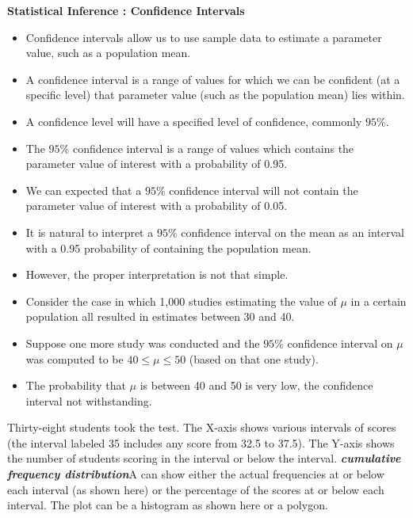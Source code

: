 \documentclass[]{report}
\begin{document}

\textbf{Statistical Inference : Confidence Intervals}
\begin{itemize}
\item Confidence intervals allow us to use sample data to estimate a parameter value, such as a population mean.
\item A confidence interval is a range of values for which we can be confident (at a specific level) that parameter value (such as the population mean)  lies within.
\item A confidence level will have a specified level of confidence, commonly $95\%$.
\item The $95\%$ confidence interval is a range of values which contains the parameter value of interest with a probability of 0.95.
\item We can expected that a $95\%$ confidence interval will not contain the parameter value of interest with a probability of 0.05.
\end{itemize}



\begin{itemize}

\item It is natural to interpret a $95\%$ confidence interval on the mean as an interval with a 0.95 probability of containing the population mean.
\item However, the proper interpretation is not that simple.
\item Consider the case in which 1,000 studies estimating the value of $\mu$  in a certain population all resulted
in estimates between 30 and 40.
\item Suppose one more study was conducted and the $95\%$ confidence interval on $\mu$ was computed
to be $40 \leq \mu \leq 50$ (based on that one study).

\item The probability that $\mu$ is between 40 and 50 is very low, the confidence interval not withstanding.

\end{itemize}




\normalsize


{
Thirty-eight students took the test. The X-axis shows various intervals of scores (the interval labeled 35 includes any score from 32.5 to 37.5). The Y-axis shows the number of students scoring in the interval or below the interval.
\textbf{\emph{cumulative frequency distribution}}A can show either the actual frequencies at or below each interval (as shown here) or the percentage of the scores at or below each interval. The plot can be a histogram as shown here or a polygon.
}
\end{document}
